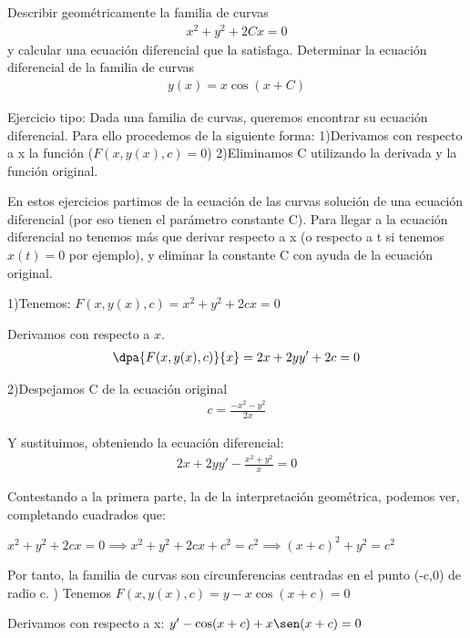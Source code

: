 \documentclass[nochap]{apuntes}
\begin{document}
\begin{problem}[6]
\ppart Describir geométricamente la familia de curvas
\begin{gather*}
x^2+y^2+2Cx=0
\end{gather*}
y calcular una ecuación diferencial que la satisfaga.
\ppart Determinar la ecuación diferencial de la familia de curvas
\begin{gather*}
y(x) = x\cos (x+C)
\end{gather*}

\solution

\spart
\begin{expla}
Ejercicio tipo:
Dada una familia de curvas, queremos encontrar su ecuación diferencial. Para ello procedemos de la siguiente forma:
1)Derivamos con respecto a x la función ($F(x,y(x),c)=0$)
2)Eliminamos C utilizando la derivada y la función original.

En estos ejercicios partimos de la ecuación de las curvas solución de una ecuación diferencial (por eso tienen el parámetro constante C). Para llegar a la ecuación diferencial no tenemos más que derivar respecto a x (o respecto a t si tenemos $x(t)=0$ por ejemplo), y eliminar la constante C con ayuda de la ecuación original.
\end{expla}

1)Tenemos: $F(x,y(x),c)=x^2+y^2+2cx=0$

Derivamos con respecto a $x$.
\begin{gather*}
\dpa{F(x,y(x),c)}{x}=2x+2yy'+2c=0
\end{gather*}

2)Despejamos C de la ecuación original
\begin{gather*}
c=\frac{-x^2-y^2}{2x}
\end{gather*}

Y sustituimos, obteniendo la ecuación diferencial:
\begin{gather*}
2x+2yy'-\frac{x^2+y^2}{x}=0
\end{gather*}

Contestando a la primera parte, la de la interpretación geométrica, podemos ver, completando cuadrados que:

$x^2+y^2+2cx=0 \implies x^2+y^2+2cx+c^2=c^2 \implies (x+c)^2 + y^2 = c^2 $

Por tanto, la familia de curvas son circunferencias centradas en el punto (-c,0) de radio c.
\newpage
{}) Tenemos $F(x,y(x),c)=y-x\cos(x+c)=0$

Derivamos con respecto a x:
$y'-\cos(x+c)+x\sen(x+c)=0$


\end{problem}
\end{document}

